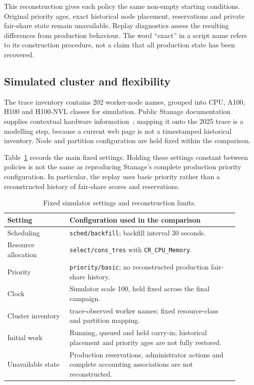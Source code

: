 This reconstruction gives each policy the same non-empty starting conditions. Original priority ages, exact historical node placement, reservations and private fair-share state remain unavailable. Replay diagnostics assess the resulting differences from production behaviour. The word ``exact'' in a script name refers to its construction procedure, not a claim that all production state has been recovered.
\FloatBarrier

\subsection{Simulated cluster and flexibility}
The trace inventory contains 202 worker-node names, grouped into CPU, A100, H100 and H100-NVL classes for simulation. Public Stanage documentation supplies contextual hardware information~\cite{sheffieldStanage}; mapping it onto the 2025 trace is a modelling step, because a current web page is not a timestamped historical inventory. Node and partition configuration are held fixed within the comparison.

Table~\ref{tab:fixed-simulator-configuration} records the main fixed settings. Holding these settings constant between policies is not the same as reproducing Stanage's complete production priority configuration. In particular, the replay uses basic priority rather than a reconstructed history of fair-share scores and reservations.
\begin{table}[htbp]\centering\small
\caption{Fixed simulator settings and reconstruction limits.}\label{tab:fixed-simulator-configuration}
\begin{tabular}{@{}>{\raggedright\arraybackslash}p{0.25\linewidth}>{\raggedright\arraybackslash}p{0.68\linewidth}@{}}\toprule
Setting & Configuration used in the comparison\\\midrule
Scheduling & \texttt{sched/backfill}; backfill interval 30 seconds.\\
Resource allocation & \texttt{select/cons\_tres} with \texttt{CR\_CPU\_Memory}.\\
Priority & \texttt{priority/basic}; no reconstructed production fair-share history.\\
Clock & Simulator scale 100, held fixed across the final campaign.\\
Cluster inventory & 202 trace-observed worker names; fixed resource-class and partition mapping.\\
Initial work & Running, queued and held carry-in; historical placement and priority ages are not fully restored.\\
Unavailable state & Production reservations, administrator actions and complete accounting associations are not reconstructed.\\\bottomrule
\end{tabular}
\end{table}

